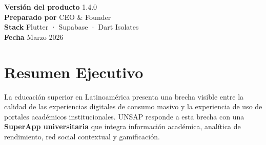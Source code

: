 \documentclass[10.5pt,a4paper]{article}
\begin{document}
\begin{titlepage}
\vspace*{\fill}

\begin{minipage}[b]{0.5\textwidth}
  {\color{unsaMuted}\scriptsize
    \textbf{\color{white!70!coverBg}Versión del producto} \hfill 1.4.0\\[3pt]
    \textbf{\color{white!70!coverBg}Preparado por} \hfill CEO \& Founder\\[3pt]
    \textbf{\color{white!70!coverBg}Stack} \hfill Flutter · Supabase · Dart Isolates\\[3pt]
    \textbf{\color{white!70!coverBg}Fecha} \hfill Marzo 2026
  }
\end{minipage}
\hfill
\begin{minipage}[b]{0.44\textwidth}
\end{minipage}

\vspace{0.8cm}

\end{titlepage}



{
  \hypersetup{linkcolor=unsaInk}
  \tableofcontents
}
\newpage

\listoftables
\listoffigures
\newpage



\section{Resumen Ejecutivo}

La educación superior en Latinoamérica presenta una brecha visible entre la calidad de las experiencias digitales de consumo masivo y la experiencia de uso de portales académicos institucionales. UNSAP responde a esta brecha con una \textbf{SuperApp universitaria} que integra información académica, analítica de rendimiento, red social contextual y gamificación.
\end{document}

